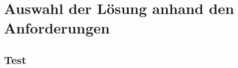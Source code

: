 

\chapter{Auswahl der Lösung anhand den Anforderungen}  %
\label{cha:Auswahl der Lösung anhand Anforderungen} %
\section{Test} %
\label{sec:} %


\subsection{} %
\label{sse:}
\subsubsection{} %
\label{sss:}
